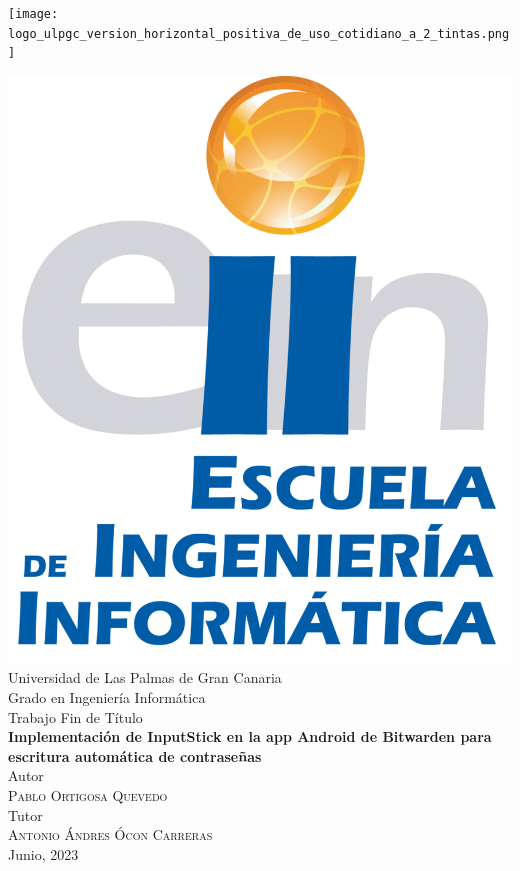 \begin{center}

    \texttt{[image: logo\_ulpgc\_version\_horizontal\_positiva\_de\_uso\_cotidiano\_a\_2\_tintas.png]}
    
    \includegraphics[height=0.2\textheight]{gfx/eii-logo-texto.png}\\[0.4cm]


    {\Large Universidad de Las Palmas de Gran Canaria}\\[0.2cm]
    {\Large Grado en Ingeniería Informática}\\[0.2cm]
    {\Large Trabajo Fin de Título}\\[0.2cm]

    {
      \LARGE\bfseries Implementación de InputStick en la app Android de Bitwarden para escritura automática de contraseñas \\[0.2cm]
    }
    {\large Autor}\\[0.1cm]
    \textsc{\large Pablo Ortigosa Quevedo}\\[0.4cm]
    {\large Tutor}\\[0.1cm]
    \textsc{\large Antonio Ándres Ócon Carreras}\\[0.4cm]
    Junio, 2023
\end{center}
